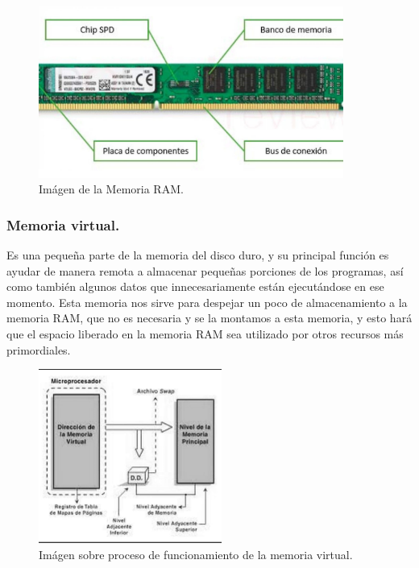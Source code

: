 \documentclass{article}
\begin{document}
\begin{figure}[h]
\includegraphics[width=10cm]{imagen3.jpg}
\centering
\caption{Imágen de la Memoria RAM. \cite{img3}}
\label{fig:imagen3}
\end{figure}
\paragraph{}
\subsubsection{Memoria virtual.}

Es una pequeña parte de la memoria del disco duro, y su principal función es ayudar de manera remota a almacenar pequeñas porciones de los programas, así como también algunos datos que innecesariamente están ejecutándose en ese momento. Esta memoria nos sirve para despejar un poco de almacenamiento a la memoria RAM, que no es necesaria y se la montamos a esta memoria, y esto hará que el espacio liberado en la memoria RAM sea utilizado por otros recursos más primordiales.

\begin{figure}[h]
\includegraphics[width=6cm]{imagen4.png}
\centering
\caption{Imágen sobre proceso de funcionamiento de la memoria virtual\cite{img4}.}
\label{fig:imagen4}
\end{figure}
\paragraph{}
\newpage
\end{document}
